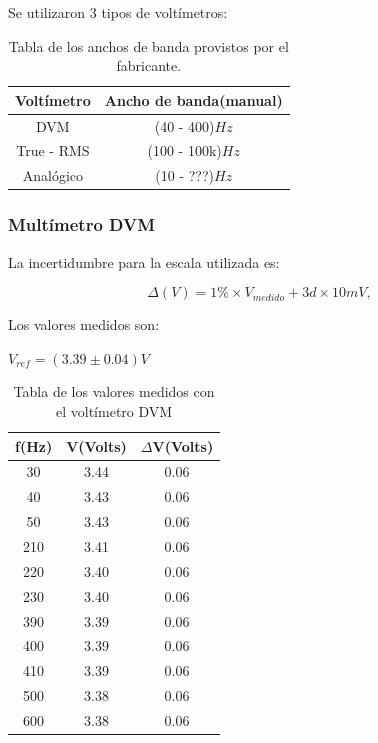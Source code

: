 \documentclass{article}
\begin{document}
Se utilizaron 3 tipos de voltímetros:
\bigskip

\begin{table}[!hbt]
	\begin{center}
	\begin{tabular}{|c|c|}\hline
	\textbf{Voltímetro} & \textbf{Ancho de banda(manual)}\\ \hline
    DVM &  (40 - 400)$Hz$\\ \hline
    True - RMS &  (100 - 100k)$Hz$\\ \hline
    Analógico &  (10 - ???)$Hz$\\ \hline
	\end{tabular}
	\caption{Tabla de los anchos de banda provistos por el fabricante.}
	\end{center}
\end{table}

\subsubsection{Multímetro DVM}

La incertidumbre para la escala utilizada es:

\begin{equation}
 	\Delta(V) = 1\%\times V_{medido} + 3d\times 10mV,
\end{equation}
\medskip

Los valores medidos son:

\begin{center}
$V_{ref} = (3.39 \pm 0.04) V$
\end{center}

\begin{table}[!hbt]
	\begin{center}
	\begin{tabular}{|c|c|c|}\hline
	\textbf{f(Hz)} & \textbf{V(Volts)} & \textbf{$\Delta$V(Volts)} \\ \hline

	30 & 3.44 &  0.06	\\ \hline
    40 & 3.43 &	0.06\\ \hline
    50 & 3.43 &	0.06\\ \hline
	210 & 3.41 & 0.06\\ \hline
	220 & 3.40 & 0.06\\ \hline
	230 & 3.40 & 0.06\\ \hline
	390 & 3.39 & 0.06\\ \hline
	400 & 3.39 & 0.06\\ \hline
	410 & 3.39 & 0.06\\	 \hline
	500 & 3.38 & 0.06\\ \hline
	600 & 3.38 & 0.06\\ \hline
	\end{tabular}
	\caption{Tabla de los valores medidos con el voltímetro DVM}
	\end{center}
\end{table}
\bigskip
\end{document}
